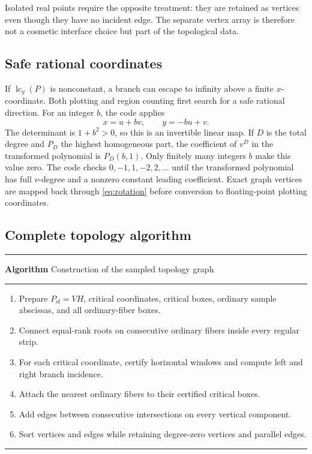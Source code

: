 \documentclass[11pt,a4paper]{article}
\newcounter{algorithm}
\newenvironment{reportalgorithm}[1]{%
  \refstepcounter{algorithm}%
  \par\medskip\noindent
  \begin{minipage}{\textwidth}
  \hrule\vspace{0.35em}
  \textbf{Algorithm \thealgorithm}\quad #1
  \vspace{0.2em}\hrule\vspace{0.35em}
  \begin{enumerate}[leftmargin=2em,itemsep=0.16em,topsep=0.2em]
}{%
  \end{enumerate}
  \vspace{0.1em}\hrule
  \end{minipage}
  \par\medskip
}
\newcommand{\lc}{\operatorname{lc}}
\begin{document}
Isolated real points require the opposite treatment: they are retained as
vertices even though they have no incident edge. The separate vertex array is
therefore not a cosmetic interface choice but part of the topological data.

\subsection{Safe rational coordinates}

If $\lc_y(P)$ is nonconstant, a branch can escape to infinity above a finite
$x$-coordinate. Both plotting and region counting first search for a safe
rational direction. For an integer $b$, the code applies
\begin{equation}
  x=u+bv,
  \qquad
  y=-bu+v.
  \label{eq:rotation}
\end{equation}
The determinant is $1+b^2>0$, so this is an invertible linear map. If $D$ is
the total degree and $P_D$ the highest homogeneous part, the coefficient of
$v^D$ in the transformed polynomial is $P_D(b,1)$. Only finitely many integers
$b$ make this value zero. The code checks $0,-1,1,-2,2,\ldots$ until the
transformed polynomial has full $v$-degree and a nonzero constant leading
coefficient. Exact graph vertices are mapped back through
\cref{eq:rotation} before conversion to floating-point plotting coordinates.

\subsection{Complete topology algorithm}

\begin{reportalgorithm}{Construction of the sampled topology graph}
  \item Prepare $P_{\mathrm{sf}}=VH$, critical coordinates, critical boxes,
        ordinary sample abscissas, and all ordinary-fiber boxes.
  \item Connect equal-rank roots on consecutive ordinary fibers inside every
        regular strip.
  \item For each critical coordinate, certify horizontal windows and compute
        left and right branch incidence.
  \item Attach the nearest ordinary fibers to their certified critical boxes.
  \item Add edges between consecutive intersections on every vertical
        component.
  \item Sort vertices and edges while retaining degree-zero vertices and
        parallel edges.
\end{reportalgorithm}
\end{document}
